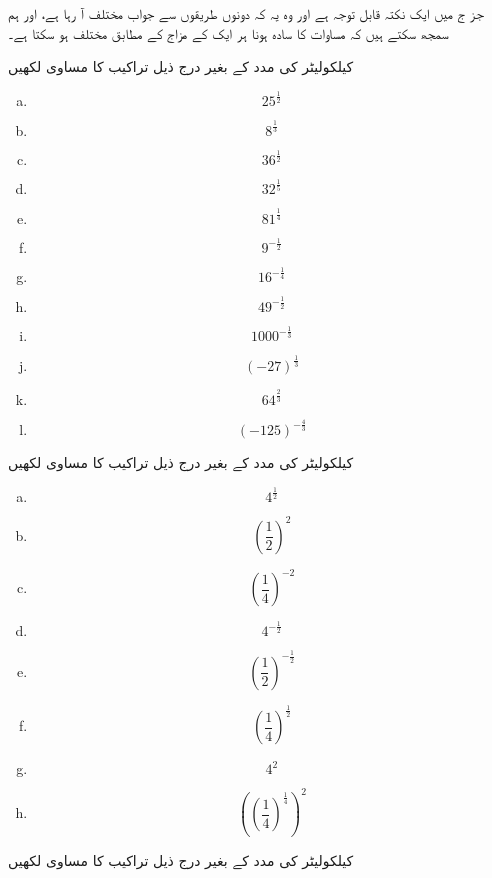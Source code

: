 جز ج میں ایک نکتہ قابل توجہ ہے اور وہ یہ کہ دونوں طریقوں سے جواب مختلف آ رہا ہے، اور ہم سمجھ سکتے ہیں کہ مساوات کا سادہ ہونا ہر ایک کے مزاج کے مطابق مختلف ہو سکتا ہے۔



کیلکولیٹر کی مدد کے بغیر درج ذیل تراکیب کا مساوی لکھیں

\begin{multicols}{4}
\begin{enumerate}[a.]
\item
\[25^{\frac{1}{2}}\]
\item
\[8^{\frac{1}{3}}\]
\item
\[36^{\frac{1}{2}}\]
\item
\[32^{\frac{1}{5}}\]
\item
\[81^{\frac{1}{4}}\]
\item
\[9^{-\frac{1}{2}}\]
\item
\[16^{-\frac{1}{4}}\]
\item
\[49^{-\frac{1}{2}}\]
\item
\[1000^{-\frac{1}{3}}\]
\item
\[(-27)^{\frac{1}{3}}\]
\item
\[64^{\frac{2}{3}}\]
\item
\[(-125)^{-\frac{4}{3}}\]
\end{enumerate}
\end{multicols}


کیلکولیٹر کی مدد کے بغیر درج ذیل تراکیب کا مساوی لکھیں

\begin{multicols}{4}
\begin{enumerate}[a.]
\item
\[4^{\frac{1}{2}}\]
\item
\[(\frac{1}{2})^{2}\]
\item
\[(\frac{1}{4})^{-2}\]
\item
\[4^{-\frac{1}{2}}\]
\item
\[(\frac{1}{2})^{-\frac{1}{2}}\]
\item
\[(\frac{1}{4})^{\frac{1}{2}}\]
\item
\[4^{2}\]
\item
\[((\frac{1}{4})^{\frac{1}{4}})^{2}\]
\end{enumerate}
\end{multicols}



کیلکولیٹر کی مدد کے بغیر درج ذیل تراکیب کا مساوی لکھیں

